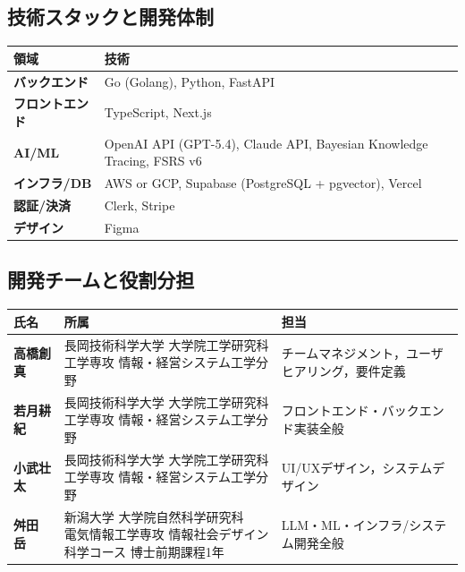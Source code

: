 \documentclass[paper=a4,fontsize=10.5bp,jafontsize=10.5bp,twocolumn]{jlreq}
\begin{document}
\subsection{技術スタックと開発体制}

\begin{scriptsize}\noindent
\begin{tabularx}{\linewidth}{>{\bfseries}l X}
\toprule
領域 & 技術 \\
\midrule
バックエンド & Go (Golang), Python, FastAPI \\
フロントエンド & TypeScript, Next.js \\
AI/ML & OpenAI API (GPT-5.4), Claude API, Bayesian Knowledge Tracing, FSRS v6 \\
インフラ/DB & AWS or GCP, Supabase (PostgreSQL + pgvector), Vercel \\
認証/決済 & Clerk, Stripe \\
デザイン & Figma \\
\bottomrule
\end{tabularx}
\end{scriptsize}

\subsection{開発チームと役割分担}

\begin{scriptsize}\noindent
\begin{tabularx}{\linewidth}{>{\bfseries}l l X}
\toprule
氏名 & 所属 & 担当 \\
\midrule
高橋創真 & \parbox[t]{3.2cm}{長岡技術科学大学 大学院工学研究科\\工学専攻 情報・経営システム工学分野} & チームマネジメント，ユーザヒアリング，要件定義 \\[4pt]
若月耕紀 & \parbox[t]{3.2cm}{長岡技術科学大学 大学院工学研究科\\工学専攻 情報・経営システム工学分野} & フロントエンド・バックエンド実装全般 \\[4pt]
小武壮太 & \parbox[t]{3.2cm}{長岡技術科学大学 大学院工学研究科\\工学専攻 情報・経営システム工学分野} & UI/UXデザイン，システムデザイン \\[4pt]
舛田　岳 & \parbox[t]{3.2cm}{新潟大学 大学院自然科学研究科\\電気情報工学専攻 情報社会デザイン科学コース 博士前期課程1年} & LLM・ML・インフラ/システム開発全般 \\
\bottomrule
\end{tabularx}
\end{scriptsize}
\end{document}
